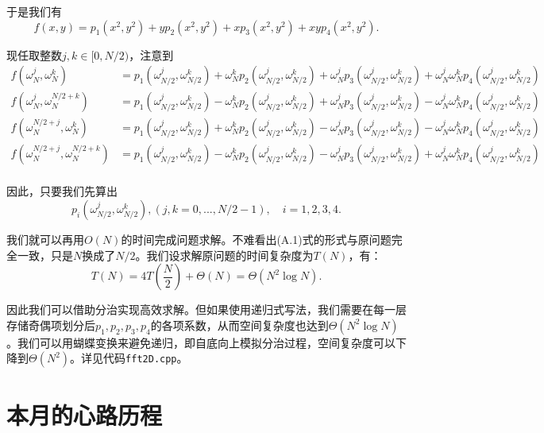 \documentclass[lang=cn,10pt,bibend=bibtex]{elegantbook}
\begin{document}
于是我们有
\begin{equation*}
    f(x,y)=p_1(x^2,y^2)+yp_2(x^2,y^2)+xp_3(x^2,y^2)+xyp_4(x^2,y^2).
\end{equation*}

现任取整数$j,k\in[0,N/2)$，注意到
\begin{align*}
    f(\omega_N^j,\omega_N^k)&=p_1(\omega_{N/2}^j,\omega_{N/2}^k)+\omega_N^kp_2(\omega_{N/2}^j,\omega_{N/2}^k)+\omega_N^jp_3(\omega_{N/2}^j,\omega_{N/2}^k)+\omega_N^j\omega_N^kp_4(\omega_{N/2}^j,\omega_{N/2}^k)\\
    f(\omega_N^j,\omega_N^{N/2+k})&=p_1(\omega_{N/2}^j,\omega_{N/2}^k)-\omega_N^kp_2(\omega_{N/2}^j,\omega_{N/2}^k)+\omega_N^jp_3(\omega_{N/2}^j,\omega_{N/2}^k)-\omega_N^j\omega_N^kp_4(\omega_{N/2}^j,\omega_{N/2}^k)\\
    f(\omega_N^{N/2+j},\omega_N^k)&=p_1(\omega_{N/2}^j,\omega_{N/2}^k)+\omega_N^kp_2(\omega_{N/2}^j,\omega_{N/2}^k)-\omega_N^jp_3(\omega_{N/2}^j,\omega_{N/2}^k)-\omega_N^j\omega_N^kp_4(\omega_{N/2}^j,\omega_{N/2}^k)\\
    f(\omega_N^{N/2+j},\omega_N^{N/2+k})&=p_1(\omega_{N/2}^j,\omega_{N/2}^k)-\omega_N^kp_2(\omega_{N/2}^j,\omega_{N/2}^k)-\omega_N^jp_3(\omega_{N/2}^j,\omega_{N/2}^k)+\omega_N^j\omega_N^kp_4(\omega_{N/2}^j,\omega_{N/2}^k)\\
\end{align*}

因此，只要我们先算出
\begin{equation}
    p_i(\omega_{N/2}^j,\omega_{N/2}^k),(j,k=0,...,N/2-1),\quad i=1,2,3,4.
\end{equation}

我们就可以再用$O(N)$的时间完成问题求解。不难看出(A.1)式的形式与原问题完全一致，只是$N$换成了$N/2$。我们设求解原问题的时间复杂度为$T(N)$，有：
\begin{equation*}
    T(N)=4T\left(\frac{N}{2}\right)+\Theta(N)=\Theta(N^2\log N).
\end{equation*}

因此我们可以借助分治实现高效求解。但如果使用递归式写法，我们需要在每一层存储奇偶项划分后$p_1,p_2,p_3,p_4$的各项系数，从而空间复杂度也达到$\Theta(N^2\log N)$。我们可以用蝴蝶变换来避免递归，即自底向上模拟分治过程，空间复杂度可以下降到$\Theta(N^2)$。详见代码\verb|fft2D.cpp|。

\newpage

\chapter{本月的心路历程}
\end{document}
